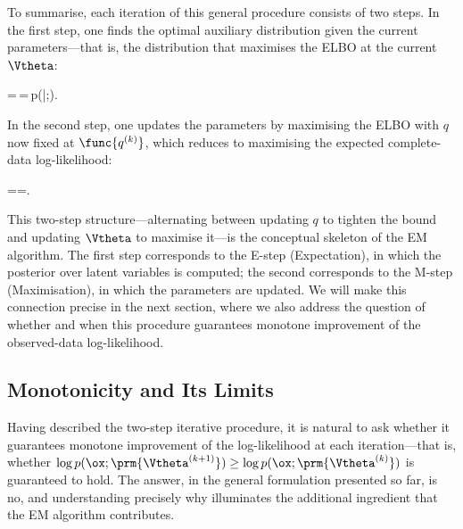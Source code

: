 To summarise, each iteration of this general procedure consists of two steps. In the first
step, one finds the optimal auxiliary distribution given the current parameters---that is, the
distribution that maximises the ELBO at the current $\Vtheta$:
\begin{myequation}
  =\,=\,p(\z|\ox;).
\end{myequation}
In the second step, one updates the parameters by maximising the ELBO with $q$ now
fixed at $\func{q^{(k)}}$, which reduces to maximising the expected complete-data
log-likelihood:
\begin{myequation}
  ==.
\end{myequation}
This two-step structure---alternating between updating $q$ to tighten the bound and
updating $\Vtheta$ to maximise it---is the conceptual skeleton of the EM algorithm. The
first step corresponds to the E-step (Expectation), in which the posterior over latent
variables is computed; the second corresponds to the M-step (Maximisation), in which the
parameters are updated. We will make this connection precise in the next section, where
we also address the question of whether and when this procedure guarantees monotone
improvement of the observed-data log-likelihood.

\subsection*{Monotonicity and Its Limits}

Having described the two-step iterative procedure, it is natural to ask whether it guarantees
monotone improvement of the log-likelihood at each iteration---that is, whether
$\log p(\ox;\prm{\Vtheta^{(k+1)}}) \geq \log p(\ox;\prm{\Vtheta^{(k)}})$ is guaranteed to
hold. The answer, in the general formulation presented so far, is no, and understanding
precisely why illuminates the additional ingredient that the EM algorithm contributes.

